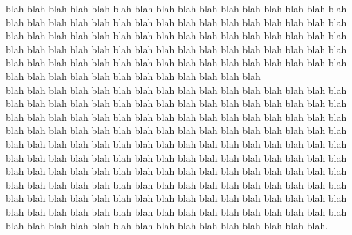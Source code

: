 \documentclass[10pt]{article}
\begin{document}
\FROM

\vspace{30pt} 

\TO

blah blah blah blah blah blah blah blah blah blah blah blah blah blah blah blah blah blah blah blah blah blah blah blah blah blah blah blah blah blah blah blah blah blah blah blah blah blah blah blah blah blah blah blah blah blah blah blah blah blah blah blah blah blah blah blah blah blah blah blah blah blah blah blah blah blah blah blah blah blah blah blah blah blah blah blah blah blah blah blah blah blah blah blah blah blah blah blah blah blah blah blah \\

blah blah blah blah blah blah blah blah blah blah blah blah blah blah blah blah blah blah blah blah blah blah blah blah blah blah blah blah blah blah blah blah blah blah blah blah blah blah blah blah blah blah blah blah blah blah blah blah blah blah blah blah blah blah blah blah blah blah blah blah blah blah blah blah blah blah blah blah blah blah blah blah blah blah blah blah blah blah blah blah blah blah blah blah blah blah blah blah blah blah blah blah blah blah blah blah blah blah blah blah blah blah blah blah blah blah blah blah blah blah blah blah blah blah blah blah blah blah blah blah blah blah blah blah blah blah blah blah \\

blah blah blah blah blah blah blah blah blah blah blah blah blah blah blah blah blah blah blah blah blah blah blah blah blah blah blah blah blah blah blah blah blah blah blah blah blah blah blah blah blah blah blah blah blah blah blah. \\


\salutationsignature
\end{document}
